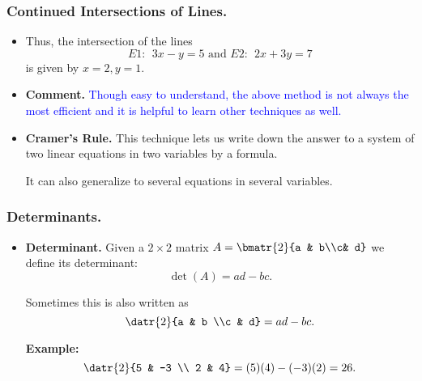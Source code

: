 \begin{frame}
 
    \frametitle{Continued Intersections of Lines.} 


    \begin{itemize}%
    
 \item Thus, the intersection of the lines 
 $$E1:~~3x-y=5 \mbox{ and } E2:~~ 2x+3y = 7$$
 is given by  $x=2,y=1$.
    
 \item {\bf Comment.} 
 \textcolor{blue}{Though easy to understand, the above method is not always the most 
 efficient and it is helpful to learn 
other techniques as well.}

\item {\bf Cramer's Rule.}
This technique lets us write down the answer to a system of two linear equations in 
two variables by a formula.

It can also generalize to several equations in several variables.

    \end{itemize}
 
\end{frame}




\begin{frame}
  \frametitle{Determinants.}
  
 \begin{itemize}%
 \item {\bf Determinant.}
 Given a $2 \times 2 $ matrix $A = \bmatr{2}{a & b\\c& d}$ we define its determinant:
 $$\det(A) = ad-bc.$$
 
  Sometimes this is also written as 
 $$\datr{2}{a & b \\c & d}=ad-bc.$$


 {\bf  Example:} $$\datr{2}{5 & -3 \\ 2 & 4} = (5)(4)-(-3)(2)=26.$$
 
 \end{itemize}
\end{frame}




